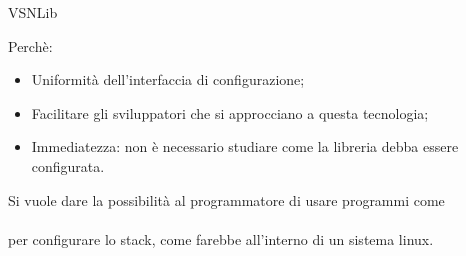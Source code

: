 \documentclass{beamer}
\begin{document}
\begin{frame}[fragile]{VSNLib}

Perch\`e:\newline
\begin{itemize}
    \item Uniformit\`a dell'interfaccia di configurazione;
    \item Facilitare gli sviluppatori che si approcciano a questa tecnologia;
    \item Immediatezza: non \`e necessario studiare come la libreria debba essere configurata.
\end{itemize}
\vspace{1em}
Si vuole dare la possibilit\`a al programmatore di usare programmi come\\\vspace{1em}  \\
\vspace{1em}
per configurare lo stack, come farebbe all'interno di un sistema linux.
\end{frame}
\end{document}
